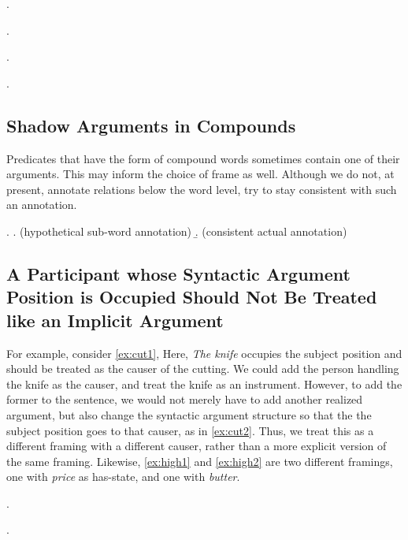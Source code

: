 \documentclass[a4paper]{article}
\newcommand{\rl}[1]{\textsf{#1}}
\begin{document}
\ex.

\ex.

\ex.

\ex.


\newpage\subsection{Shadow Arguments in Compounds}

Predicates that have the form of compound words sometimes contain one of their
arguments. This may inform the choice of frame as well. Although we do not, at
present, annotate relations below the word level, try to stay consistent with
such an annotation.

\ex.
\a. (hypothetical sub-word annotation)
\b. (consistent actual annotation)


\newpage\subsection{A Participant whose Syntactic Argument Position is Occupied Should Not Be Treated like an Implicit Argument}

For example, consider \ref{ex:cut1}, Here, \emph{The knife} occupies the subject position and should be treated as the causer of the cutting. We could add the person handling the knife as the causer, and treat the knife as an instrument. However, to add the former to the sentence, we would not merely have to add another realized argument, but also change the syntactic argument structure so that the the subject position goes to that causer, as in \ref{ex:cut2}. Thus, we treat this as a different framing with a different causer, rather than a more explicit version of the same framing. Likewise, \ref{ex:high1} and \ref{ex:high2} are two different framings, one with \emph{price} as \rl{has-state}, and one with \emph{butter}.

\ex.\label{ex:cut1}

\ex.\label{ex:cut2}
\end{document}
